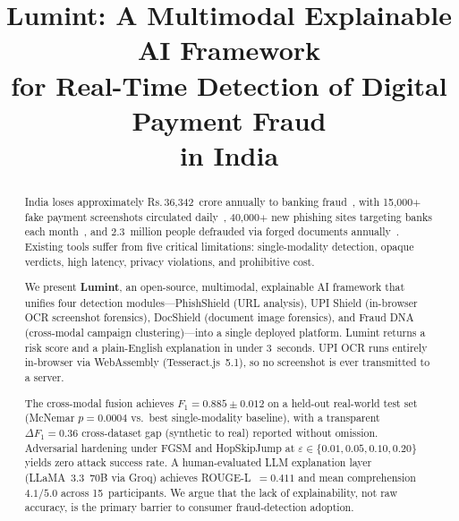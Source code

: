 \documentclass[conference]{IEEEtran}
\def\rupee{\textrm{Rs.\,}}
\begin{document}
\title{Lumint: A Multimodal Explainable AI Framework\\
for Real-Time Detection of Digital Payment Fraud\\
in India}

\author{
}

\maketitle

\vspace{2mm}

\begin{abstract}
India loses approximately \rupee{}36{,}342~crore annually to banking
fraud~\cite{rbi2024}, with 15{,}000$+$ fake payment screenshots
circulated daily~\cite{certin2024}, 40{,}000$+$ new phishing sites
targeting banks each month~\cite{apwg2024}, and 2.3~million people
defrauded via forged documents annually~\cite{rbi2023framework}.
Existing tools suffer from five critical limitations: single-modality
detection, opaque verdicts, high latency, privacy violations, and
prohibitive cost.

We present \textbf{Lumint}, an open-source, multimodal, explainable AI
framework that unifies four detection modules---PhishShield (URL
analysis), UPI Shield (in-browser OCR screenshot forensics), DocShield
(document image forensics), and Fraud DNA (cross-modal campaign
clustering)---into a single deployed platform. Lumint returns a risk
score and a plain-English explanation in under 3~seconds. UPI OCR runs
entirely in-browser via WebAssembly (Tesseract.js~5.1), so no screenshot
is ever transmitted to a server.

The cross-modal fusion achieves $F_1{=}0.885{\pm}0.012$ on a held-out
real-world test set (McNemar $p{=}0.0004$ vs.\ best single-modality
baseline), with a transparent $\Delta F_1{=}0.36$ cross-dataset gap
(synthetic to real) reported without omission. Adversarial hardening
under FGSM and HopSkipJump at $\varepsilon\!\in\!\{0.01,0.05,0.10,0.20\}$
yields zero attack success rate. A human-evaluated LLM explanation layer
(LLaMA~3.3~70B via Groq) achieves ROUGE-L~$=0.411$ and mean
comprehension $4.1/5.0$ across 15~participants. We argue that the lack
of explainability, not raw accuracy, is the primary barrier to consumer
fraud-detection adoption.
\end{abstract}
\end{document}
